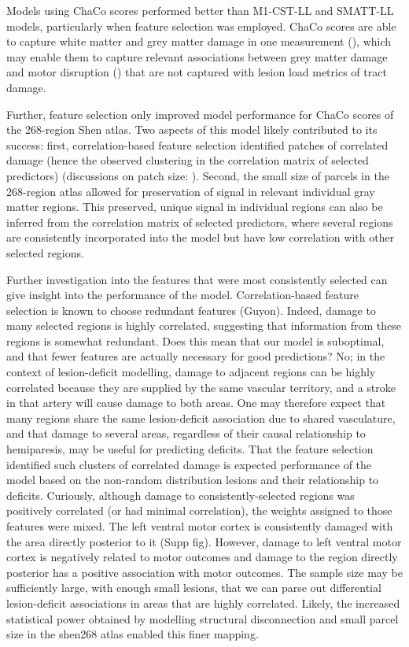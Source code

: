 \documentclass[10pt]{article}
\begin{document}
Models using ChaCo scores performed better than M1-CST-LL and SMATT-LL models, particularly when feature selection was employed. ChaCo scores are able to capture white matter and grey matter damage in one measurement (\cite{Kuceyeski2013-nk}), which may enable them to capture relevant associations between grey matter damage and motor disruption (\cite{Rondina2016-ds}) that are not captured with lesion load metrics of tract damage.

Further, feature selection only improved model performance for ChaCo scores of the 268-region Shen atlas. Two aspects of this model likely contributed to its success: first, correlation-based feature selection identified patches of correlated damage (hence the observed clustering in the correlation matrix of selected predictors) (discussions on patch size: \cite{Pustina2018-xv, Sperber2020-kp}). Second, the small size of parcels in the 268-region atlas allowed for preservation of signal in relevant individual gray matter regions. This preserved, unique signal in individual regions can also be inferred from the correlation matrix of selected predictors, where several regions are consistently incorporated into the model but have low correlation with other selected regions. 

Further investigation into the features that were most consistently selected can give insight into the performance of the model. Correlation-based feature selection is known to choose redundant features (Guyon). Indeed, damage to many selected regions is highly correlated, suggesting that information from these regions is somewhat redundant. Does this mean that our model is suboptimal, and that fewer features are actually necessary for good predictions? No; in the context of lesion-deficit modelling, damage to adjacent regions can be highly correlated because they are supplied by the same vascular territory, and a stroke in that artery will cause damage to both areas. One may therefore expect that many regions share the same lesion-deficit association due to shared vasculature, and that damage to several areas, regardless of their causal relationship to hemiparesis, may be useful for predicting deficits. That the feature selection identified such clusters of correlated damage is expected performance of the model based on the non-random distribution lesions and their relationship to deficits. Curiously, although damage to consistently-selected regions was positively correlated (or had minimal correlation), the weights assigned to those features were mixed. The left ventral motor cortex is consistently damaged with the area directly posterior to it (Supp fig). However, damage to left ventral motor cortex is negatively related to motor outcomes and damage to the region directly posterior has a positive association with motor outcomes. The sample size may be sufficiently large, with enough small lesions, that we can parse out differential lesion-deficit associations in areas that are highly correlated. Likely, the increased statistical power obtained by modelling structural disconnection and small parcel size in the shen268 atlas enabled this finer mapping. 
\end{document}

